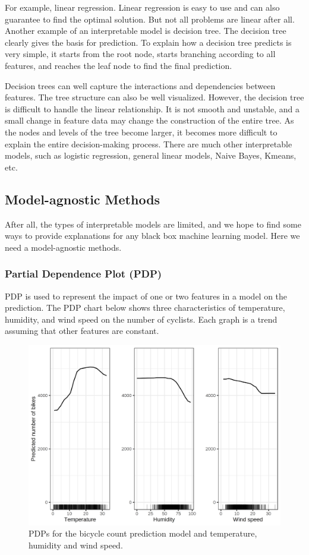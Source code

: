 For example, linear regression. Linear regression is easy to use and can also guarantee to find the optimal solution. But not all problems are linear after all. Another example of an interpretable model is decision tree. The decision tree clearly gives the basis for prediction. To explain how a decision tree predicts is very simple, it starts from the root node, starts branching according to all features, and reaches the leaf node to find the final prediction.

Decision trees can well capture the interactions and dependencies between features. The tree structure can also be well visualized. However, the decision tree is difficult to handle the linear relationship. It is not smooth and unstable, and a small change in feature data may change the construction of the entire tree. As the nodes and levels of the tree become larger, it becomes more difficult to explain the entire decision-making process. There are much other interpretable models, such as logistic regression, general linear models, Naive Bayes, Kmeans, etc.


\subsection{Model-agnostic Methods}
After all, the types of interpretable models are limited, and we hope to find some ways to provide explanations for any black box machine learning model. Here we need a model-agnostic methods.
\subsubsection{Partial Dependence Plot (PDP)}
PDP is used to represent the impact of one or two features in a model on the prediction. The PDP chart below shows three characteristics of temperature, humidity, and wind speed on the number of cyclists. Each graph is a trend assuming that other features are constant.

\begin{figure}[H]
\centering
\includegraphics[width=0.6\columnwidth]{gfx/pdp-bike-1.png}
\caption{PDPs for the bicycle count prediction model and temperature, humidity and wind speed.~\cite{molnar2019}}
\label{fig:pdp-bike}
\end{figure}


